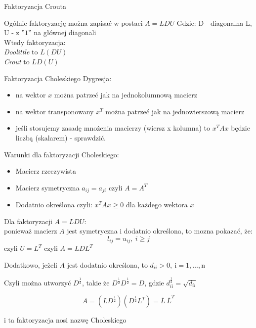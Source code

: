 \begin{frame}{Faktoryzacja Crouta}
\begin{exampleblock}{Ogólnie faktoryzację można zapisać w  postaci $A=LDU$}
Gdzie:
D - diagonalna \hspace{40mm } 
\newline
 L, U - z ''$1$'' na głównej diagonali\\ 
 \vspace{0.5cm}
 Wtedy faktoryzacja:\\
 {\it Doolittle} to  $L(DU)$\\
 {\it Crout} to   $LD(U)$
\newline 
\end{exampleblock}
\end{frame}
\begin{frame}{Faktoryzacja Choleskiego}
Dygresja:
\begin{itemize}
    \item na wektor $x$ można patrzeć jak na jednokolumnową macierz
    \item na wektor transponowany $x^T$ można patrzeć jak na jednowierszową macierz
    \item jeśli stosujemy zasadę mnożenia macierzy (wiersz x kolumna) to $x^T A x$ będzie liczbą (skalarem) - sprawdzić. 
\end{itemize}
Warunki dla faktoryzacji Choleskiego:
\begin{itemize}
    \item Macierz rzeczywista
\item Macierz symetryczna $a_{ij}=a_{ji}$  czyli $A=A^{T}$
\item Dodatnio określona czyli: $x^T A x \geq 0$ dla każdego wektora $x$
\end{itemize}
\end{frame}
\begin{frame}
  Dla faktoryzacji $A=LDU$:\\

ponieważ macierz $A$ jest symetryczna i dodatnio określona, to mozna pokazać, że:
$$
l_{ij}=u_{ij},\ i\geq j
$$
czyli $U=L^T$ czyli $A=LDL^{T}$

Dodatkowo, jeżeli $A$ jest dodatnio określona, to $d_{ii}>0, \ \mathrm{i}=1,\ldots,\mathrm{n}$

Czyli można utworzyć $D^{\frac{1}{2}}$, takie że
$D^{\frac{1}{2}}D^{\frac{1}{2}}=D$, gdzie $d^{\frac{1}{2}}_{ii}=\sqrt{d_{ii}}$

\begin{exampleblock}{}
$$
A=(LD^{\frac{1}{2}})(D^{\frac{1}{2}}L^{T})=\overline{L}\ \overline{L}^{T}
$$
\end{exampleblock}
i ta faktoryzacja nosi nazwę Choleskiego

\end{frame}
